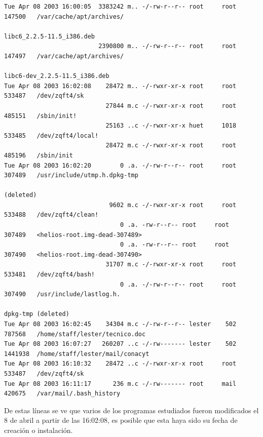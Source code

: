 {\footnotesize
\begin{lstlisting}[style=terminal]
Tue Apr 08 2003 16:00:05  3383242 m.. -/-rw-r--r-- root     root     147500   /var/cache/apt/archives/
                                                                              libc6_2.2.5-11.5_i386.deb
                          2390800 m.. -/-rw-r--r-- root     root     147497   /var/cache/apt/archives/
                                                                              libc6-dev_2.2.5-11.5_i386.deb
Tue Apr 08 2003 16:02:08    28472 m.. -/-rwxr-xr-x root     root     533487   /dev/zqft4/sk
                            27844 m.c -/-rwxr-xr-x root     root     485151   /sbin/init!
                            25163 ..c -/-rwxr-xr-x huet     1018     533485   /dev/zqft4/local!
                            28472 m.c -/-rwxr-xr-x root     root     485196   /sbin/init
Tue Apr 08 2003 16:02:20        0 .a. -/-rw-r--r-- root     root     307489   /usr/include/utmp.h.dpkg-tmp 
                                                                              (deleted)
                             9602 m.c -/-rwxr-xr-x root     root     533488   /dev/zqft4/clean!
                                0 .a. -rw-r--r-- root     root     307489   <helios-root.img-dead-307489>
                                0 .a. -rw-r--r-- root     root     307490   <helios-root.img-dead-307490>
                            31707 m.c -/-rwxr-xr-x root     root     533481   /dev/zqft4/bash!
                                0 .a. -/-rw-r--r-- root     root     307490   /usr/include/lastlog.h.
                                                                              dpkg-tmp (deleted)
Tue Apr 08 2003 16:02:45    34304 m.c -/-rw-r--r-- lester    502      787568   /home/staff/lester/tecnico.doc
Tue Apr 08 2003 16:07:27   260207 ..c -/-rw------- lester    502      1441938  /home/staff/lester/mail/conacyt
Tue Apr 08 2003 16:10:32    28472 ..c -/-rwxr-xr-x root     root     533487   /dev/zqft4/sk
Tue Apr 08 2003 16:11:17      236 m.c -/-rw------- root     mail     420675   /var/mail/.bash_history
\end{lstlisting}
}

\vspace{1em}

 De estas líneas se ve que varios de los programas estudiados fueron
modificados el 8 de abril a partir de las 16:02:08, es posible que
esta haya sido su fecha de creación o instalación.

\vspace{1em}

